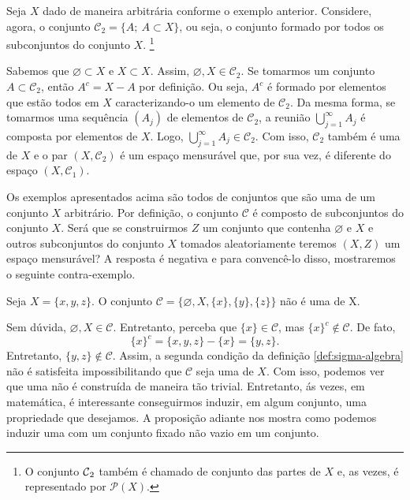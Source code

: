 \begin{example}
	\label{ex:sigma-subconjuntos}
	Seja $X$ dado de maneira arbitrária conforme o exemplo anterior.
	Considere, agora, o conjunto $\mathcal{C}_2 = \{ A; \ A \subset X\}$, ou seja, o conjunto formado por todos os subconjuntos do conjunto $X$.
	\footnote{O conjunto $\operatorname{\mathcal{C}}_2$ também é chamado de conjunto das partes de $X$ e, as vezes, é representado por $\mathcal{P}(X)$.}
\end{example}

Sabemos que $\varnothing \subset X$ e $X \subset X$. 
Assim, $\varnothing, X \in \mathcal{C}_2$. 
Se tomarmos um conjunto $A \subset \mathcal{C}_2$, então $A^c = X - A$ por definição.
Ou seja, $A^c$ é formado por elementos que estão todos em $X$ caracterizando-o um elemento de $\mathcal{C}_2$.
Da mesma forma, se tomarmos uma sequência $(A_j)$ de elementos de $\mathcal{C}_2$, a reunião 
$\displaystyle \bigcup_{j = 1}^\infty A_j$ é composta por elementos de $X$.
Logo,  $\displaystyle \bigcup_{j = 1}^\infty A_j \in \mathcal{C}_2$.
Com isso, $\mathcal{C}_2$ também é uma \sigal de $X$ e o par $(X, \mathcal{C}_2)$ é um espaço mensurável que, por sua vez, é diferente do espaço $(X,\mathcal{C}_1)$.



Os exemplos apresentados acima são todos de conjuntos que são uma \sigal de um conjunto $X$ arbitrário.
Por definição, o conjunto $\mathcal{C}$ é composto de subconjuntos do conjunto $X$. 
Será que se construirmos $Z$ um conjunto que contenha $\varnothing$ e $X$ e outros subconjuntos do conjunto $X$ tomados aleatoriamente teremos $(X,Z)$ um espaço mensurável? A resposta é negativa e para convencê-lo disso, mostraremos o seguinte contra-exemplo.

\begin{counterexample}
    Seja $X = \{x,y,z\}$. O conjunto $\mathcal{C} = \{\varnothing, X, \{x\}, \{y\}, \{z\}\}$ não é uma \sigal de X.
\end{counterexample}

Sem dúvida, $\varnothing, X \in \mathcal{C}$. 
Entretanto, perceba que $\{x\} \in \mathcal{C}$, mas $\{x\}^c \notin \mathcal{C}$.
De fato, 
$$
\{x\}^c
=\{x,y,z\} 
-\{x\} 
= \{y,z\}.
$$
Entretanto, $\{y,z\} \notin \mathcal{C}$.
Assim, a segunda condição da definição \ref{def:sigma-algebra} não é satisfeita impossibilitando que $\mathcal{C}$ seja uma \sigal de $X$.
Com isso, podemos ver que uma \sigal não é construída de maneira tão trivial.
Entretanto, ás vezes, em matemática, é interessante conseguirmos induzir, em algum conjunto, uma propriedade que desejamos. 
A proposição adiante nos mostra como podemos induzir uma \sigal com um conjunto fixado não vazio em um conjunto.

